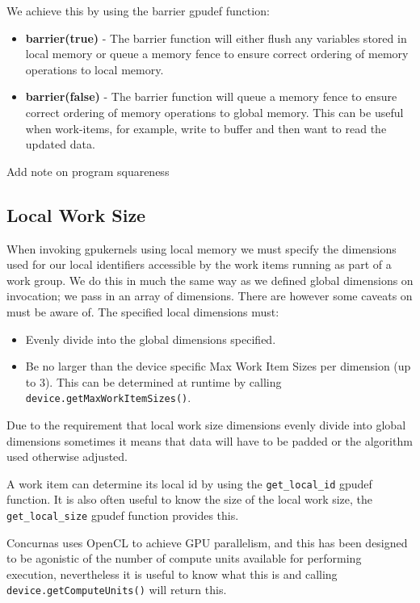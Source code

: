 \documentclass[conc-doc]{subfiles}
\begin{document}
We achieve this by using the barrier gpudef function:
\begin{itemize}
	\item \textbf{barrier(true)} - The barrier function will either flush any variables stored in local memory or queue a memory fence to ensure correct ordering of memory operations to local memory.
	\item \textbf{barrier(false)} - The barrier function will queue a memory fence to ensure correct ordering of memory operations to global memory. This can be useful when work-items, for example, write to buffer and then want to read the updated data.
\end{itemize}


Add note on program squareness

\subsection{Local Work Size}
When invoking gpukernels using local memory we must specify the dimensions used for our local identifiers accessible by the work items running as part of a work group. We do this in much the same way as we defined global dimensions on invocation; we pass in an array of dimensions. There are however some caveats on must be aware of. The specified local dimensions must:
\begin{itemize}
	\item Evenly divide into the global dimensions specified.
	\item Be no larger than the device specific Max Work Item Sizes per dimension (up to 3). This can be determined at runtime by calling \lstinline{device.getMaxWorkItemSizes()}.
\end{itemize}

Due to the requirement that local work size dimensions evenly divide into global dimensions sometimes it means that data will have to be padded or the algorithm used otherwise adjusted.  

A work item can determine its local id by using the \lstinline{get_local_id} gpudef function. It is also often useful to know the size of the local work size, the \lstinline{get_local_size} gpudef function provides this.

Concurnas uses OpenCL to achieve GPU parallelism, and this has been designed to be agonistic of the number of compute units available for performing execution, nevertheless it is useful to know what this is and calling \lstinline{device.getComputeUnits()} will return this.
\end{document}
